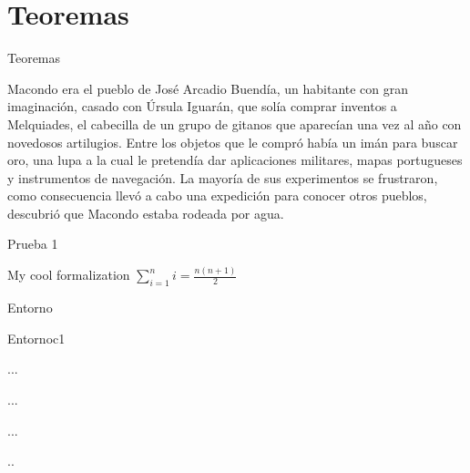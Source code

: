 \documentclass[]{beamer}
\theoremstyle{plain}
\begin{document}
\section{Teoremas}
\begin{frame}{Teoremas}
\begin{teorema}
Macondo era el pueblo de Jos\'e Arcadio Buend\'ia, un habitante con gran imaginaci\'on, casado con \'Ursula Iguar\'an, que sol\'ia comprar inventos a Melquiades, el cabecilla de un grupo de gitanos que aparec\'ian una vez al a\~no con novedosos artilugios. Entre los objetos que le compr\'o hab\'ia un im\'an para buscar oro, una lupa a la cual le pretend\'ia dar aplicaciones militares, mapas portugueses y instrumentos de navegaci\'on. La mayor\'ia de sus experimentos se frustraron, como consecuencia llev\'o a cabo una expedici\'on para conocer otros pueblos, descubri\'o que Macondo estaba rodeada por agua. 
\end{teorema}
\end{frame}
\begin{frame}{Prueba 1}
\begin{tcolorbox}[breakable,colback=blue!5,colframe=blue!75!black,title=My title]
  My cool formalization
\tcblower
  $\displaystyle\sum\limits_{i=1}^n i = \frac{n(n+1)}{2}$
\end{tcolorbox}
\end{frame}
\begin{frame}[fragile]{Entorno}
\begin{source}{Entorno}{c1}
\begin{entorno}
 ...
\end{entorno}

\begin{entorno}[(Descripción)]
 ...
\end{entorno}

\begin{entorno}[(Descripción)][referencia]
 ...
\end{entorno}

\begin{entorno}[][referencia] %
 ..
\end{entorno}

\end{source}
\end{frame}
\end{document}
